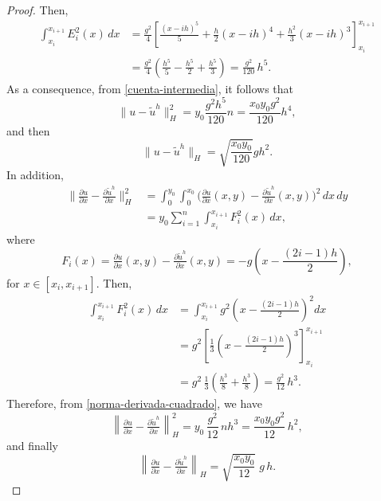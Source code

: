 \documentclass[10pt,a4paper]{amsart}
\newcommand\pder[2][]{\ensuremath{\tfrac{\partial#1}{\partial#2}}}
\newcommand{\dee}{d}
\begin{document}
\begin{proof}
Then,
\begin{equation}\label{integralEi}
\begin{aligned}
\int_{x_i}^{x_{i+1}} E_i^2(x)\,\dee x
&= \frac{g^2}{4}
\left[
\frac{(x-i h)^5}{5}
+ \frac{h}{2}(x-i h)^4
+ \frac{h^2}{3}(x-i h)^3
\right]_{x_i}^{x_{i+1}} \\[0.8ex]
&= \frac{g^2}{4}
\left(
\frac{h^5}{5}
- \frac{h^5}{2}
+ \frac{h^5}{3}
\right)
= \frac{g^2}{120}\,h^5 .
\end{aligned}
\end{equation}
As a consequence, from \eqref{cuenta-intermedia}, it follows that
$$\|u-{\widetilde{u}^h}\|_{H}^2=y_0 \frac{g^2 h^5}{120} n= \frac{x_0 y_0 g^2}{120} h^4,$$
and then
$$\|u-{\widetilde{u}^h}\|_{H}=\sqrt{\frac{x_0 y_0 }{120}} g h^2. $$
In addition,
\begin{equation}\label{norma-derivada-cuadrado}
\begin{aligned}
\big\|\pder[u]{x}-\pder[{\widetilde{u}^h}]{x}\big\|_{H}^{2}
&= \int_0^{y_0}\int_0^{x_0}
\big(\pder[u]{x}(x,y)-\pder[{\widetilde{u}^h}]{x}(x,y)\big)^2
\,\dee x\,\dee y \\[1ex]
&= y_0 \sum_{i=1}^n \int_{x_i}^{x_{i+1}} F_i^2(x)\,\dee x ,
\end{aligned}
\end{equation}
where
$$
F_i(x)
= \pder[u]{x}(x,y)-\pder[{\widetilde{u}^h}]{x}(x,y)
= -g\!\left(x-\frac{(2i-1)h}{2}\right),
$$
 for $x\in[x_i,x_{i+1}]$.
 Then,
 \[
\begin{aligned}
\int_{x_i}^{x_{i+1}} F_i^2(x)\,\dee x
&= \int_{x_i}^{x_{i+1}}
g^2\!\left(x-\frac{(2i-1)h}{2}\right)^2 \dee x \\[0.8ex]
&= g^2
\left[
\frac{1}{3}\left(x-\frac{(2i-1)h}{2}\right)^3
\right]_{x_i}^{x_{i+1}} \\
&= g^2\,
\frac{1}{3}\left(\frac{h^3}{8}+\frac{h^3}{8}\right)
= \frac{g^2}{12}\,h^3 .
\end{aligned}
\]
Therefore, from \eqref{norma-derivada-cuadrado}, we have
\[
\left\|\pder[u]{x}-\pder[{\widetilde{u}^h}]{x}\right\|_{H}^{2}
= y_0\,\frac{g^2}{12}\,n h^3
= \frac{x_0 y_0 g^2}{12}\,h^2 ,
\]
and finally
\[
\left\|\pder[u]{x}-\pder[{\widetilde{u}^h}]{x}\right\|_{H}
= \sqrt{\frac{x_0 y_0}{12}}\; g\, h .
\]
\end{proof}
\end{document}
